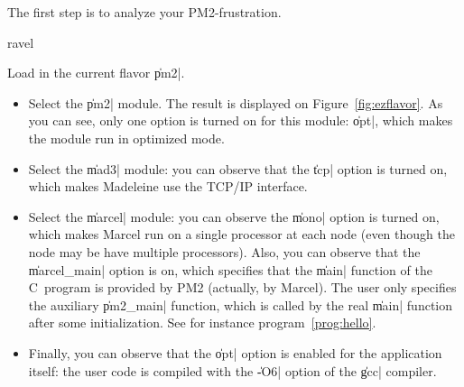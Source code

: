 The first step is to analyze your PM2-frustration. 
\begin{shell}
ravel%
\end{shell}
Load in the current flavor \|pm2|.
\begin{itemize}
  
\item Select the \|pm2| module. The result is displayed on
  Figure~\ref{fig:ezflavor}. As you can see, only one option is turned
  on for this module: \|opt|, which makes the module run in optimized
  mode. 
  
\item Select the \|mad3| module: you can observe that the \|tcp|
  option is turned on, which makes Madeleine use the TCP/IP interface.
  
\item Select the \|marcel| module: you can observe the \|mono| option
  is turned on, which makes Marcel run on a single processor at each
  node (even though the node may be have multiple processors). Also,
  you can observe that the \|marcel_main| option is on, which
  specifies that the \|main| function of the C~program is provided by
  PM2 (actually, by Marcel). The user only specifies the auxiliary
  \|pm2_main| function, which is called by the real \|main| function
  after some initialization. See for instance
  program~\ref{prog:hello}.
  
\item Finally, you can observe that the \|opt| option is enabled for
  the application itself: the user code is compiled with the
  \|-O6| option of the \|gcc| compiler.

\end{itemize}

